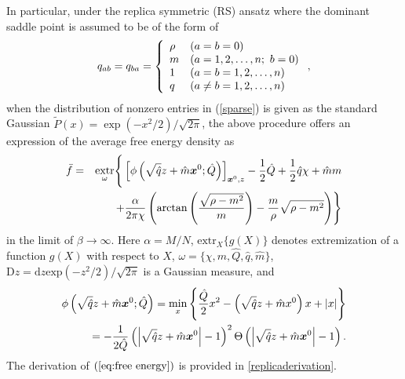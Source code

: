 \documentclass[12pt]{iopart}
\begin{document}
In particular, under the replica symmetric (RS) ansatz where the dominant saddle point is assumed to be of the form of 
\begin{eqnarray}
q_{ab}=q_{ba}=\left \{
\begin{array}{ll}
\rho & (a=b=0) \cr
m & (a=1,2,\ldots,n; \ b=0) \cr
1 & (a=b=1,2,\ldots,n) \cr
q & (a\ne b =1,2,\ldots,n) 
\end{array}
\right . ,  
\label{RSanzats}
\end{eqnarray}
when the distribution of nonzero entries in (\ref{sparse}) is given as the standard Gaussian $\tilde{P}(x)=\exp(-x^2/2)/\sqrt{2 \pi}$, the above procedure offers an expression of the average free energy density as 
\begin{eqnarray}
\bar{f} 
  &=& \mathop{\rm extr}_{\omega} \Biggr\{ \left[\phi \left(\sqrt{\hat{q}}z+\hat{m}\textrm{\boldmath $x$}^{0};\hat{Q}\right)\right]_{\textrm{\boldmath $x$}^{0},z}
-\frac{1}{2}\hat{Q}+\frac{1}{2}\hat{q}\chi+\hat{m}m \nonumber\\
 &&+\frac{\alpha}{2\pi\chi}\left(\arctan \left (\frac{\sqrt{\rho-m^2}}{m} \right )-\frac{m}{\rho}\sqrt{\rho-m^2}\right) \Biggr\} 
\label{eq:free energy}
\end{eqnarray}
in the limit of $\beta \to \infty$. Here $\alpha=M/N$, $\textrm{extr}_{X}\{g(X)\}$ denotes extremization of a function $g(X)$ with respect to $X$, $\omega = \{\chi, m, \hat{Q}, \hat{q}, \hat{m}\}$, $\textrm{D}z=\textrm{d}z \textrm{exp}(-z^2/2)/\sqrt{2\pi}$ is a Gaussian measure, and
\begin{eqnarray}
\phi \left(\sqrt{\hat{q}}z+\hat{m}\textrm{\boldmath $x$}^{0};\hat{Q}\right)
=\mathop{\rm min}_{x}\left\{ \frac{\hat{Q}}{2}x^2-\left(\sqrt{\hat{q}}z+\hat{m}x^0\right)x+\vert x \vert\right\}\nonumber\\
= -\frac{1}{2\hat{Q}}\left( \left \vert\sqrt{\hat{q}}z
+\hat{m}\textrm{\boldmath $x$}^{0} \right \vert-1\right)^2
\Theta \left (\left \vert\sqrt{\hat{q}}z+\hat{m}\textrm{\boldmath $x$}^{0} \right \vert-1 \right ).
\end{eqnarray}
The derivation of $(\ref{eq:free energy})$ is provided in \ref{replicaderivation}.
\end{document}
